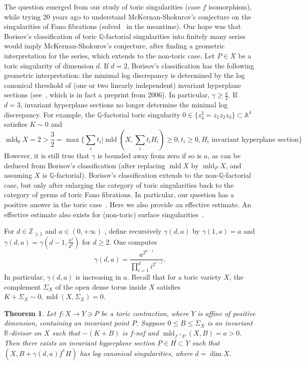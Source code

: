 \documentclass[12pt,twoside]{amsart}
\newcommand{\Q}{{\mathbb Q}}
\newcommand{\Z}{{\mathbb Z}}
\newcommand{\R}{{\mathbb R}}
\newcommand{\bA}{{\mathbb A}} %
\newcommand{\mld}{\operatorname{mld}}
\theoremstyle{plain}
\newtheorem{thm}{Theorem}[section]
\theoremstyle{definition}
\theoremstyle{remark}
\begin{document}
The question emerged from our study of toric singularities (case $f$ isomorphism), while
trying 20 years ago to understand McKernan-Shokurov's conjecture on the singularities 
of Fano fibrations (solved~\cite{Bir23} in the meantime). Our hope was that 
Borisov's classification of toric $\Q$-factorial singularities into finitely many series~\cite{Bor99} 
would imply McKernan-Shokurov's conjecture, after finding a geometric interpretation for the 
series, which extends to the non-toric case.
Let $P\in X$ be a toric singularity of dimension $d$. If $d=2$, 
Borisov's classification has the following geometric 
interpretation:  the minimal log discrepancy is determined by the log canonical threshold of (one or 
two linearly independent) invariant hyperplane sections (see~\cite{Am24}, which is in fact a preprint 
from 2006). In particular, $\gamma \ge \frac{a}{2}$. If $d=3$, invariant hyperplane sections no longer 
determine the minimal log discrepancy. For example, the $\Q$-factorial toric singularity
$0\in \{z_4^2=z_1z_2z_3\}\subset \bA^4$ satisfies $K\sim 0$ and 
$$
\mld_0X=2>\frac{3}{2}=\max\{\sum_i t_i |\mld(X,\sum_it_iH_i)\ge 0, t_i\ge 0, H_i\text{ invariant hyperplane section} \}
$$
However, it is still true that $\gamma$ is bounded away from zero if so is $a$, as can be deduced  
from Borisov's classification (after replacing $\mld X$ by $\mld_PX$, and assuming $X$ is $\Q$-factorial). 
Borisov's classification extends to the non-$\Q$-factorial case, but only after enlarging the category of 
toric singularities back to the category of germs of toric Fano fibrations. In particular, our question has a positive answer 
in the toric case~\cite[Theorem 3.12]{Am22}. Here we also provide an effective estimate. 
An effective estimate also exists for (non-toric) surface singularities~\cite[Theorem 1.7]{Bin24}.

For  $d \in \Z_{ \ge 1}$ and $a\in (0,+\infty)$ , define recursively $\gamma(d,a)$ by
$\gamma(1,a)=a$ and $\gamma(d,a)=\gamma(d-1,\frac{a^2}{d^2})$ for $d\ge 2$.
One computes
$$
\gamma(d,a)=\frac{a^{2^{d-1}}}{\prod_{i=1}^d i^{2^{i-1}}}.
$$
In particular, $\gamma(d,a)$ is increasing in $a$. Recall that for a toric variety $X$,
the complement $\Sigma_X$ of the open dense torus inside $X$ satisfies 
$K+\Sigma_X\sim 0, \mld(X,\Sigma_X)=0$.

\begin{thm}\label{m1}
	Let $f \colon X \to Y\ni P$ be a toric contraction, where $Y$ is affine of positive
	dimension, containing an invariant point $P$. Suppose $0\le B\le \Sigma_X$ is an 
	invariant $\R$-divisor on $X$ such that  $-(K+B)$ is $f$-nef and 
	$\mld_{f^{-1}P}(X,B)=a>0$. 
	Then there exists an invariant hyperplane section $P\in H\subset Y$ such that 
	$(X,B+\gamma(d,a) f^*H)$ has log canonical singularities, where $d=\dim X$.
\end{thm}
\end{document}
